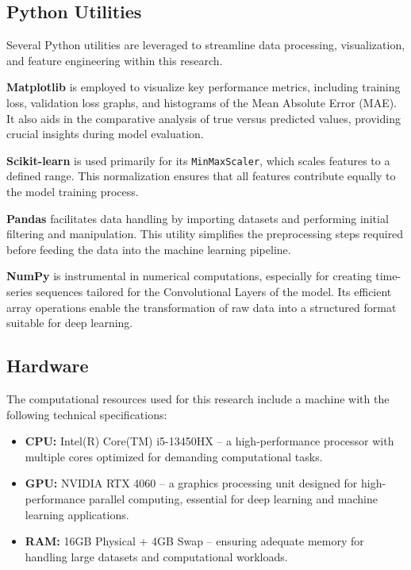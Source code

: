 \subsection{Python Utilities}

Several Python utilities are leveraged to streamline data processing, visualization, and feature engineering within this research.

\textbf{Matplotlib} is employed to visualize key performance metrics, including training loss, validation loss graphs, and histograms of the Mean Absolute Error (MAE). It also aids in the comparative analysis of true versus predicted values, providing crucial insights during model evaluation.

\textbf{Scikit-learn} is used primarily for its \texttt{MinMaxScaler}, which scales features to a defined range. This normalization ensures that all features contribute equally to the model training process.

\textbf{Pandas} facilitates data handling by importing datasets and performing initial filtering and manipulation. This utility simplifies the preprocessing steps required before feeding the data into the machine learning pipeline.

\textbf{NumPy} is instrumental in numerical computations, especially for creating time-series sequences tailored for the Convolutional Layers of the model. Its efficient array operations enable the transformation of raw data into a structured format suitable for deep learning.

\subsection{Hardware}

The computational resources used for this research include a machine with the following technical specifications:

\begin{itemize}
    \item \textbf{CPU:} Intel(R) Core(TM) i5-13450HX – a high-performance processor with multiple cores optimized for demanding computational tasks.
    \item \textbf{GPU:} NVIDIA RTX 4060 – a graphics processing unit designed for high-performance parallel computing, essential for deep learning and machine learning applications.
    \item \textbf{RAM:} 16GB Physical + 4GB Swap – ensuring adequate memory for handling large datasets and computational workloads.
\end{itemize}
